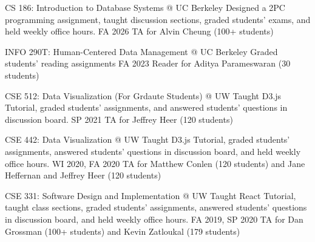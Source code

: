 

\begin{cvpubs}

  \cvteach
    {CS 186: Introduction to Database Systems @ UC Berkeley} %
    {Designed a 2PC programming assignment, taught discussion sections, graded students' exams, and held weekly office hours.} %
    {FA 2026} %
    {TA for Alvin Cheung (100+ students)} %

  \cvteach
    {INFO 290T: Human-Centered Data Management @ UC Berkeley} %
    {Graded students' reading assignments} %
    {FA 2023} %
    {Reader for Aditya Parameswaran (30 students)} %

  \cvteach
    {CSE 512: Data Visualization (For Grdaute Students) @ UW} %
    {Taught D3.js Tutorial, graded students' assignments, and answered students' questions in discussion board.} %
    {SP 2021} %
    {TA for Jeffrey Heer (120 students)} %

  \cvteach
    {CSE 442: Data Visualization @ UW} %
    {Taught D3.js Tutorial, graded students' assignments, answered students' questions in discussion board, and held weekly office hours.} %
    {WI 2020, FA 2020} %
    {TA for Matthew Conlen (120 students) and Jane Heffernan and Jeffrey Heer (120 students)} %

  \cvteach
    {CSE 331: Software Design and Implementation @ UW} %
    {Taught React Tutorial, taught class sections, graded students' assignments, answered students' questions in discussion board, and held weekly office hours.} %
    {FA 2019, SP 2020} %
    {TA for Dan Grossman (100+ students) and Kevin Zatloukal (179 students)} %


\end{cvpubs}
